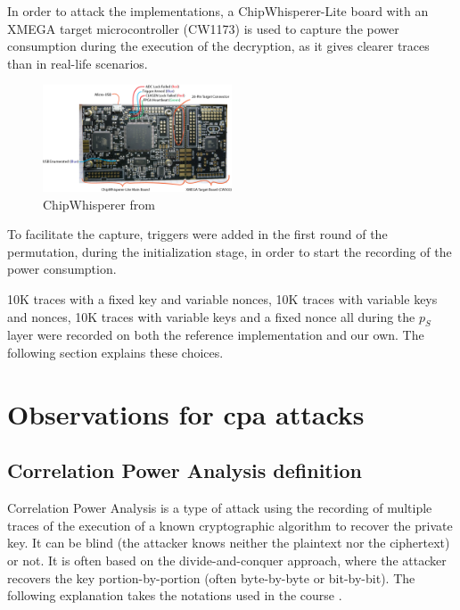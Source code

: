 \documentclass[11pt,technote]{IEEEtran}
\begin{document}
		In order to attack the implementations, a ChipWhisperer-Lite board with an XMEGA target microcontroller (CW1173) is used to capture the power consumption during the execution of the decryption, as it gives clearer traces than in real-life scenarios.
		
		\begin{figure}[h]
			\includegraphics[width=0.5\textwidth]{img_files/cwlite_basic1}
			\caption{ChipWhisperer from \cite{cwdoc}}
			\label{fig:cw}
		\end{figure}
		
		To facilitate the capture, triggers were added in the first round of the permutation, during the initialization stage, in order to start the recording of the power consumption.
		
		10K traces with a fixed key and variable nonces, 10K traces with variable keys and nonces, 10K traces with variable keys and a fixed nonce all during the $p_S$ layer were recorded on both the reference implementation and our own. The following section explains these choices.
		
		\section{Observations for \ac{cpa} attacks}
		\subsection{Correlation Power Analysis definition}
		Correlation Power Analysis\cite{cpa_aes} is a type of attack using the recording of multiple traces of the execution of a known cryptographic algorithm to recover the private key. It can be blind (the attacker knows neither the plaintext nor the ciphertext) or not. It is often based on the divide-and-conquer approach, where the attacker recovers the key portion-by-portion (often byte-by-byte or bit-by-bit). The following explanation takes the notations used in the course \cite{cours}.
		
\end{document}
